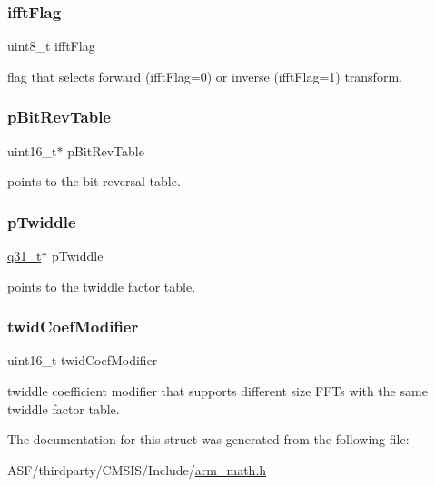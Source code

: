 \subsubsection{\texorpdfstring{ifftFlag}{ifftFlag}}
{\footnotesize\ttfamily uint8\+\_\+t ifft\+Flag}

flag that selects forward (ifft\+Flag=0) or inverse (ifft\+Flag=1) transform. \mbox{\label{structarm__cfft__radix4__instance__q31_a46a2fb328199897af100fea0bfdf59aa}} 
\subsubsection{\texorpdfstring{pBitRevTable}{pBitRevTable}}
{\footnotesize\ttfamily uint16\+\_\+t$\ast$ p\+Bit\+Rev\+Table}

points to the bit reversal table. \mbox{\label{structarm__cfft__radix4__instance__q31_a2505b7d5ec077b244c712797a5253b6d}} 
\subsubsection{\texorpdfstring{pTwiddle}{pTwiddle}}
{\footnotesize\ttfamily \mbox{\hyperlink{arm__math_8h_adc89a3547f5324b7b3b95adec3806bc0}{q31\+\_\+t}}$\ast$ p\+Twiddle}

points to the twiddle factor table. \mbox{\label{structarm__cfft__radix4__instance__q31_afe772e5b5001c9d8e85032115a8df5bf}} 
\subsubsection{\texorpdfstring{twidCoefModifier}{twidCoefModifier}}
{\footnotesize\ttfamily uint16\+\_\+t twid\+Coef\+Modifier}

twiddle coefficient modifier that supports different size F\+F\+Ts with the same twiddle factor table. 

The documentation for this struct was generated from the following file\+:\begin{DoxyCompactItemize}
\item 
A\+S\+F/thirdparty/\+C\+M\+S\+I\+S/\+Include/\mbox{\hyperlink{arm__math_8h}{arm\+\_\+math.\+h}}\end{DoxyCompactItemize}
